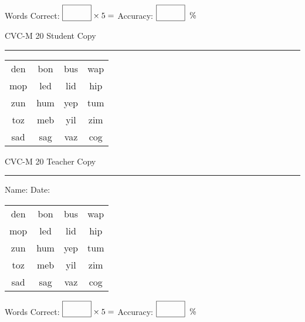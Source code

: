 \documentclass{memoir}
\begin{document}
\small

Words Correct: $\fbox{\phantom{\huge 100}} \times 5 = $ Accuracy: $\fbox{\phantom{\huge 100}}\;\; \%$ 

\vfill

\newpage



\footnotesize \noindent
CVC-M 20 \hfill Student Copy
\smallskip
\hrule

\Large

\setlength{\tabcolsep}{14pt}
\def\arraystretch{2}

{\selectfont


\begin{vplace}[0.5]
\begin{center}
\begin{tabular}{cccc}
den & bon & bus & wap \\
mop & led & lid & hip \\
zun & hum & yep & tum \\
toz & meb & yil & zim \\
sad & sag & vaz & cog \\
\end{tabular}
\end{center}
\end{vplace}

}

\newpage

\footnotesize \noindent
CVC-M 20 \hfill Teacher Copy
\smallskip
\hrule

\small

\vfill

\noindent
Name: \underline{\hspace{1.75in}} \hfill Date: \underline{\hspace{1in}}

\Large

{\selectfont


\begin{vplace}[0.5]
\begin{center}
\begin{tabular}{cccc}
den & bon & bus & wap \\
mop & led & lid & hip \\
zun & hum & yep & tum \\
toz & meb & yil & zim \\
sad & sag & vaz & cog \\
\end{tabular}
\end{center}
\end{vplace}



}

\small

Words Correct: $\fbox{\phantom{\huge 100}} \times 5 = $ Accuracy: $\fbox{\phantom{\huge 100}}\;\; \%$ 

\vfill

\end{document}
